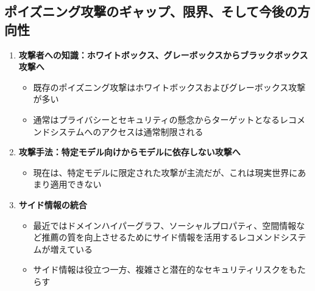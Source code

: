 \documentclass[11pt,a4paper]{article}
\begin{document}
\subsection{ポイズニング攻撃のギャップ、限界、そして今後の方向性}
\begin{enumerate}
    \item \textbf{攻撃者への知識：ホワイトボックス、グレーボックスからブラックボックス攻撃へ}
    \begin{itemize}
        \item 既存のポイズニング攻撃はホワイトボックスおよびグレーボックス攻撃が多い
        \item 通常はプライバシーとセキュリティの懸念からターゲットとなるレコメンドシステムへのアクセスは通常制限される
    \end{itemize}
    
    \item \textbf{攻撃手法：特定モデル向けからモデルに依存しない攻撃へ}
    \begin{itemize}
        \item 現在は、特定モデルに限定された攻撃が主流だが、これは現実世界にあまり適用できない
    \end{itemize}
    
    \item \textbf{サイド情報の統合}
    \begin{itemize}
        \item 最近ではドメインハイパーグラフ、ソーシャルプロパティ、空間情報など推薦の質を向上させるためにサイド情報を活用するレコメンドシステムが増えている
        \item サイド情報は役立つ一方、複雑さと潜在的なセキュリティリスクをもたらす
    \end{itemize}
\end{enumerate}
\end{document}
